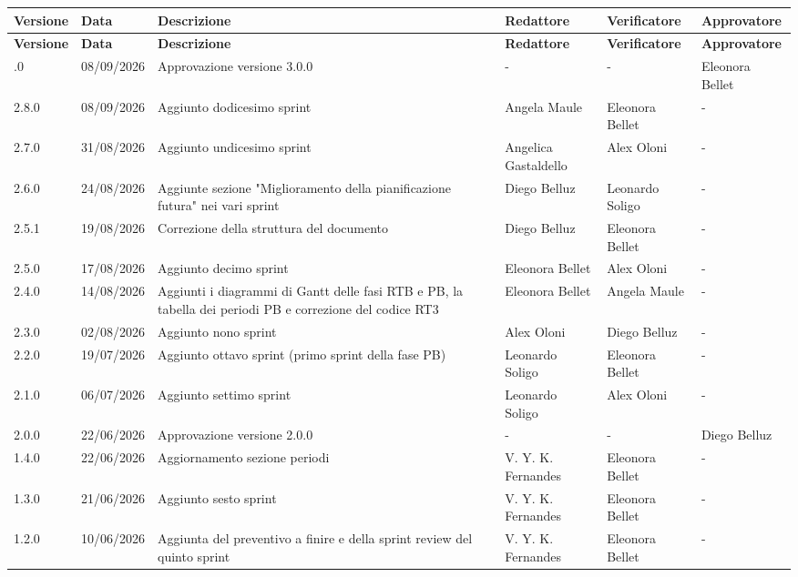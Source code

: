 \documentclass[a4paper,12pt]{article}
\begin{document}
\setlength{\tabcolsep}{3pt} 
\footnotesize
\begin{longtable}{|l|l|p{4.5cm}|p{2cm}|p{2.5cm}|p{2.5cm}|}
    \hline
    \rowcolor{gray!20}
    \textbf{Versione} & \textbf{Data} & \textbf{Descrizione} & \textbf{Redattore} & \textbf{Verificatore} & \textbf{Approvatore} \\
    \hline
    \endfirsthead 
    \hline
    \rowcolor{gray!20}
    \textbf{Versione} & \textbf{Data} & \textbf{Descrizione} & \textbf{Redattore} & \textbf{Verificatore} & \textbf{Approvatore} \\
    \hline
    \endhead
    \endfoot
    \endlastfoot 
    3.0.0 & 08/09/2026 & Approvazione versione 3.0.0 & - & - & Eleonora Bellet \\ \hline
    2.8.0 & 08/09/2026 & Aggiunto dodicesimo sprint & Angela Maule & Eleonora Bellet & - \\ \hline
    2.7.0 & 31/08/2026 & Aggiunto undicesimo sprint & Angelica Gastaldello & Alex Oloni & - \\ \hline
    2.6.0 & 24/08/2026 & Aggiunte sezione "Miglioramento della pianificazione futura" nei vari sprint & Diego Belluz & Leonardo Soligo & - \\ \hline
    2.5.1 & 19/08/2026 & Correzione della struttura del documento & Diego Belluz & Eleonora Bellet & - \\ \hline
    2.5.0 & 17/08/2026 & Aggiunto decimo sprint & Eleonora Bellet & Alex Oloni & - \\ \hline
    2.4.0 & 14/08/2026 & Aggiunti i diagrammi di Gantt delle fasi RTB e PB, la tabella dei periodi PB e correzione del codice RT3 & Eleonora Bellet & Angela Maule & - \\ \hline
    2.3.0 & 02/08/2026 & Aggiunto nono sprint & Alex Oloni & Diego Belluz & - \\ \hline
    2.2.0 & 19/07/2026 & Aggiunto ottavo sprint (primo sprint della fase PB) & Leonardo Soligo & Eleonora Bellet & - \\ \hline
    2.1.0 & 06/07/2026 & Aggiunto settimo sprint & Leonardo Soligo & Alex Oloni & - \\ \hline
    2.0.0 & 22/06/2026 & Approvazione versione 2.0.0 & - & - & Diego Belluz \\ \hline
    1.4.0 & 22/06/2026 & Aggiornamento sezione periodi & V. Y. K. Fernandes & Eleonora Bellet & - \\ \hline
    1.3.0 & 21/06/2026 & Aggiunto sesto sprint & V. Y. K. Fernandes & Eleonora Bellet & - \\ \hline
    1.2.0 & 10/06/2026 & Aggiunta del preventivo a finire e della sprint review del quinto sprint & V. Y. K. Fernandes & Eleonora Bellet & - \\ \hline

\end{longtable}
\end{document}
